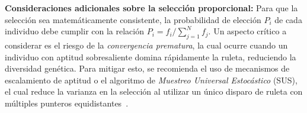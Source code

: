 \documentclass[12pt]{article}
\begin{document}
\textbf{Consideraciones adicionales sobre la selección proporcional:}
Para que la selección sea matemáticamente consistente, la probabilidad de elección $P_i$ de cada individuo debe cumplir con la relación $P_i = f_i / \sum_{j=1}^{N} f_j$. Un aspecto crítico a considerar es el riesgo de la \textit{convergencia prematura}, la cual ocurre cuando un individuo con aptitud sobresaliente domina rápidamente la ruleta, reduciendo la diversidad genética. Para mitigar esto, se recomienda el uso de mecanismos de escalamiento de aptitud o el algoritmo de \textit{Muestreo Universal Estocástico} (SUS), el cual reduce la varianza en la selección al utilizar un único disparo de ruleta con múltiples punteros equidistantes~\cite{Eiben2015}.




\end{document}
